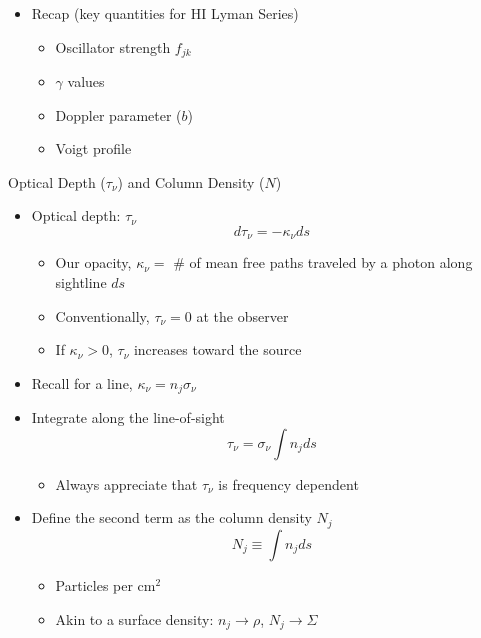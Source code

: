 \documentclass[12pt,letterpaper]{article}
\begin{document}
\begin{Aenumerate}
\begin{itemize}
\item Recap (key quantities for HI Lyman Series)
	\begin{itemize}
	\item Oscillator strength $f_{jk}$
	\item $\gamma$ values
	\item Doppler parameter ($b$)
	\item Voigt profile
	\end{itemize}


\end{itemize}

{\bf \item Optical Depth ($\tau_\nu$) and Column Density ($N$)}
	\begin{itemize}
	  \item Optical depth:  \quad $\tau_\nu$
	\begin{equation}
	d\tau_\nu = -\kappa_\nu ds
	\end{equation}
		\begin{itemize}
		\item Our opacity, $\kappa_\nu = $ \# of mean free paths traveled 
		by a photon along sightline $ds$
		\item Conventionally, $\tau_\nu = 0$ at the observer
		\item If $\kappa_\nu > 0$, $\tau_\nu$ increases toward the source
		\end{itemize}
	\item Recall for a line, $\kappa_\nu = n_j \sigma_\nu$	
	\item Integrate along the line-of-sight
	\begin{equation}
	\tau_\nu = \sigma_\nu \int n_j ds
	\end{equation}
		\begin{itemize}
		\item Always appreciate that $\tau_\nu$ is frequency dependent
		\end{itemize}
	\item Define the second term as the column density $N_j$
	\begin{equation}
	N_j \equiv \int n_j ds
	\end{equation}
		\begin{itemize}
		\item Particles per cm$^2$
		\item Akin to a surface density:  $n_j \to \rho$, $N_j \to \Sigma$

\end{itemize}
\end{itemize}
\end{Aenumerate}
\end{document}
